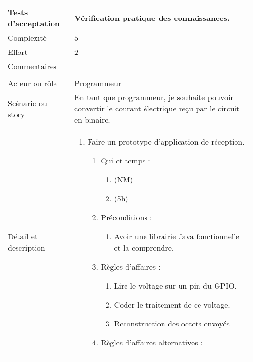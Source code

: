 \begin{longtable}{|l|p{}|}
\hline
    Tests d'acceptation & Vérification pratique des connaissances. \\
\hline
    Complexité & 5 \\
\hline
    Effort & 2 \\
\hline
    Commentaires & \\

\hline
    \rowcolor{Gray}
    \multicolumn{2}{|l|}{6} \\
\hline
    Acteur ou rôle & Programmeur \\
\hline
    Scénario ou story & En tant que programmeur, je
    souhaite pouvoir convertir le courant électrique reçu par le circuit en binaire. \\
\hline
    Détail et description &
        \begin{enumerate}[label*=\arabic*.]
            \item Faire un prototype d'application de réception.
                \begin{enumerate}[label*=\arabic*.]
                                \item Qui et temps :
                                \begin{enumerate}[label*=\arabic*.]
                                    \item (NM)
                                    \item (5h)
                                \end{enumerate}
                                \item Préconditions :
                                \begin{enumerate}[label*=\arabic*.]
                                    \item Avoir une librairie Java fonctionnelle et la comprendre.
                                \end{enumerate}
                                \item Règles d'affaires :
                                \begin{enumerate}[label*=\arabic*.]
                                    \item Lire le voltage sur un pin du GPIO.
                                    \item Coder le traitement de ce voltage.
                                    \item Reconstruction des octets envoyés.
                                \end{enumerate}
                                \item Règles d'affaires alternatives :

\end{enumerate}
\end{enumerate}
\end{longtable}
